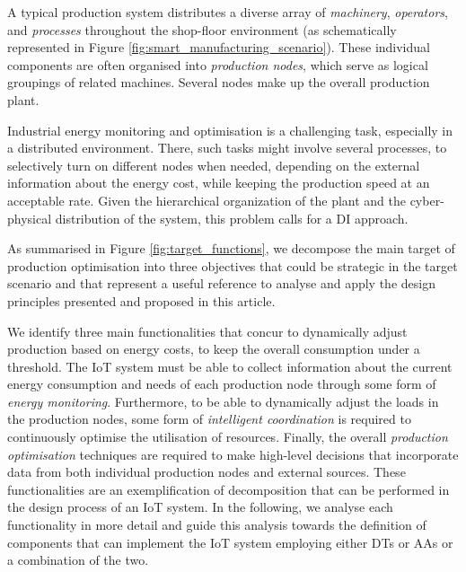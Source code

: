 A typical production system distributes a diverse array of \textit{machinery}, \textit{operators}, and \textit{processes} throughout the shop-floor environment (as schematically represented in Figure \ref{fig:smart_manufacturing_scenario}). 
%
These individual components are often organised into \textit{production nodes}, which serve as logical groupings of related machines.
Several nodes make up the overall production plant.

Industrial energy monitoring \cite{Ageed2021ASO, Cai2022ARO} and optimisation \cite{Hussain2021SmartAI} is a challenging task, especially in a distributed environment. 
There, such tasks might involve several processes, to selectively turn on different nodes when needed, depending on the external information about the energy cost, while keeping the production speed at an acceptable rate.
%
Given the hierarchical organization of the plant and the cyber-physical distribution of the system, this problem calls for a DI approach.

As summarised in Figure \ref{fig:target_functions}, we decompose the main target of production optimisation into three objectives that could be strategic in the target scenario and that represent a useful reference to analyse and apply the design principles presented and proposed in this article.

We identify three main functionalities that concur to dynamically adjust production based on energy costs, to keep the overall consumption under a threshold. 
The IoT system must be able to collect information about the current energy consumption and needs of each production node through some form of \emph{energy monitoring}. Furthermore, to be able to dynamically adjust the loads in the production nodes, some form of \emph{intelligent coordination} is required to continuously optimise the utilisation of resources. Finally, the overall \emph{production optimisation} techniques are required to make high-level decisions that incorporate data from both individual production nodes and external sources.
These functionalities are an exemplification of decomposition that can be performed in the design process of an IoT system. In the following, we analyse each functionality in more detail and guide this analysis towards the definition of components that can implement the IoT system employing either DTs or AAs or a combination of the two.

